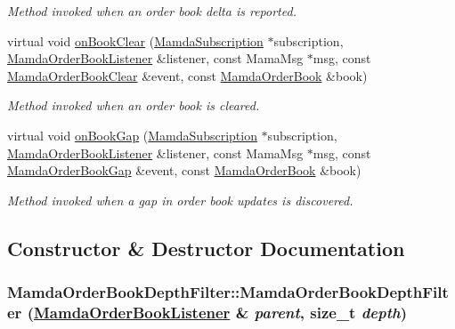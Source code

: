 \begin{CompactItemize}
\begin{CompactList}\small\item\em Method invoked when an order book delta is reported. \item\end{CompactList}\item 
virtual void \hyperlink{classMamdaOrderBookDepthFilter_70d8025a3e8ce565c80dfeb5c6dc66eb}{on\-Book\-Clear} (\hyperlink{classWombat_1_1MamdaSubscription}{Mamda\-Subscription} $\ast$subscription, \hyperlink{classWombat_1_1MamdaOrderBookListener}{Mamda\-Order\-Book\-Listener} \&listener, const Mama\-Msg $\ast$msg, const \hyperlink{classWombat_1_1MamdaOrderBookClear}{Mamda\-Order\-Book\-Clear} \&event, const \hyperlink{classWombat_1_1MamdaOrderBook}{Mamda\-Order\-Book} \&book)
\begin{CompactList}\small\item\em Method invoked when an order book is cleared. \item\end{CompactList}\item 
virtual void \hyperlink{classMamdaOrderBookDepthFilter_ae2a8192b2034af1d1b3d6ef71521e8a}{on\-Book\-Gap} (\hyperlink{classWombat_1_1MamdaSubscription}{Mamda\-Subscription} $\ast$subscription, \hyperlink{classWombat_1_1MamdaOrderBookListener}{Mamda\-Order\-Book\-Listener} \&listener, const Mama\-Msg $\ast$msg, const \hyperlink{classWombat_1_1MamdaOrderBookGap}{Mamda\-Order\-Book\-Gap} \&event, const \hyperlink{classWombat_1_1MamdaOrderBook}{Mamda\-Order\-Book} \&book)
\begin{CompactList}\small\item\em Method invoked when a gap in order book updates is discovered. \item\end{CompactList}\end{CompactItemize}


\subsection{Constructor \& Destructor Documentation}
\hypertarget{classMamdaOrderBookDepthFilter_d45bb83d3e4b75f23000ab10f753d6c5}{
\subsubsection[MamdaOrderBookDepthFilter]{\setlength{\rightskip}{0pt plus 5cm}Mamda\-Order\-Book\-Depth\-Filter::Mamda\-Order\-Book\-Depth\-Filter (\hyperlink{classWombat_1_1MamdaOrderBookListener}{Mamda\-Order\-Book\-Listener} \& {\em parent}, size\_\-t {\em depth})}}
\label{classMamdaOrderBookDepthFilter_d45bb83d3e4b75f23000ab10f753d6c5}


